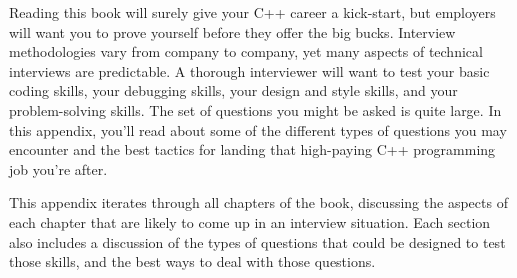Reading this book will surely give your C++ career a kick-start, but employers will want you to prove yourself before they offer the big bucks. Interview methodologies vary from company to company, yet many aspects of technical interviews are predictable. A thorough interviewer will want to test your basic coding skills, your debugging skills, your design and style skills, and your problem-solving skills. The set of questions you might be asked is quite large. In this appendix, you’ll read about some of the different types of questions you may encounter and the best tactics for landing that high-paying C++ programming job you’re after.

This appendix iterates through all chapters of the book, discussing the aspects of each chapter that are likely to come up in an interview situation. Each section also includes a discussion of the types of questions that could be designed to test those skills, and the best ways to deal with those questions.